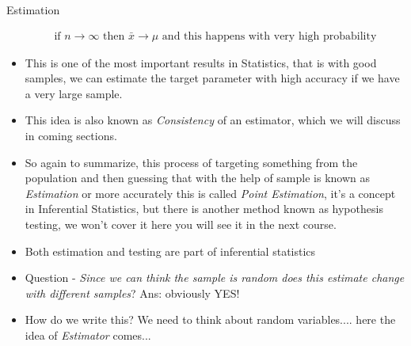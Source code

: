 \documentclass[8pt, usepdftitle=false]{beamer}
\begin{document}
\begin{frame}[allowframebreaks]{Estimation}
\begin{itemize}
   \begin{align*}
      \text{if } n \to \infty \text{ then } \bar{x} \to \mu \text{ and this happens with very high probability}
   \end{align*}


   \item This is one of the most important results in Statistics, that is with good samples, we can estimate the target parameter with high accuracy if we have a very large sample. 

   \item This idea is also known as \emph{Consistency} of an estimator, which we will discuss in coming sections.



  \item So again to summarize, this process of targeting something from the population and then guessing that with the help of sample is known as \emph{Estimation} or more accurately this is called \emph{Point Estimation}, it's a concept in Inferential Statistics, but there is another method known as hypothesis testing, we won't cover it here you will see it in the next course.

  \item Both estimation and testing are part of inferential statistics




\item Question  - \emph{Since we can think the sample is random does this estimate change with different samples}? Ans: obviously YES!

\item How do we write this? We need to think about random variables.... here the idea of \emph{Estimator} comes...


\end{itemize}
\end{frame}
\end{document}
